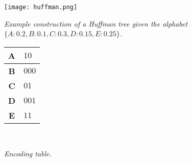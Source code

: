 \documentclass[12pt, fleqn]{general}
\begin{document}
    \newpage

    \begin{center}
    \texttt{[image: huffman.png]}\\\vspace{10pt}

    \emph{Example construction of a Huffman tree given the alphabet $\{A:0.2, B:0.1, C:0.3, D:0.15, E:0.25\}$.}\\\vspace{10pt}

    \begin{tabular}{|c|l|}\hline
        \textbf{A}&$10$\\\hline
        \textbf{B}&$000$\\\hline
        \textbf{C}&$01$\\\hline
        \textbf{D}&$001$\\\hline
        \textbf{E}&$11$\\\hline
    \end{tabular}\\\vspace{10pt}

    \emph{Encoding table.}
    \end{center}

    \newpage

    \begin{multicols*}{2}

\end{multicols*}
\end{document}
